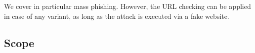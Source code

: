 We cover in particular mass phishing. However, the URL checking can be applied in case of any variant, as long as the attack is executed via a fake website.
\subsection{Scope}
\label{s:scope}


